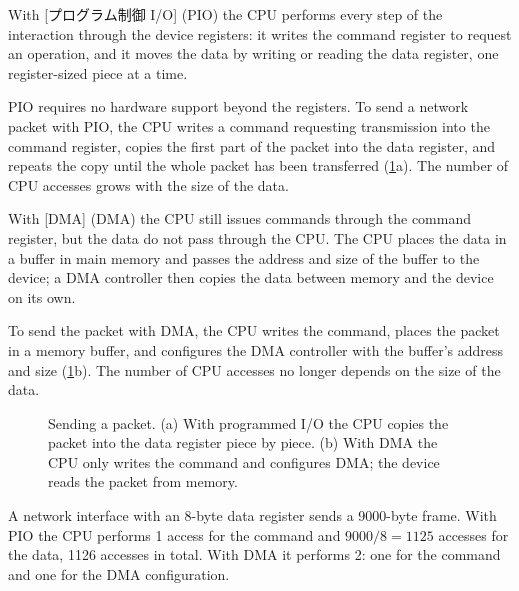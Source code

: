 \documentclass[../main.tex]{subfiles}
\begin{document}
\begin{definition}[Programmed I/O]
  With [プログラム制御 I/O]%
   (PIO) the CPU performs every step of the
  interaction through the device registers: it writes the command register
  to request an operation, and it moves the data by writing or reading the
  data register, one register-sized piece at a time.
\end{definition}

PIO requires no hardware support beyond the registers.  To send a network
packet with PIO, the CPU writes a command requesting transmission into the
command register, copies the first part of the packet into the data
register, and repeats the copy until the whole packet has been transferred
(\cref{fig:l11-pio-dma}a).  The number of CPU accesses grows with the size of
the data.

\begin{definition}
  With [DMA]
  (DMA) the CPU still issues commands through the command register, but the
  data do not pass through the CPU.  The CPU places the data in a buffer in
  main memory and passes the address and size of the buffer to the device;
  a DMA controller then copies the data between memory and the device on its
  own.
\end{definition}

To send the packet with DMA, the CPU writes the command, places the packet
in a memory buffer, and configures the DMA controller with the buffer's
address and size (\cref{fig:l11-pio-dma}b).  The number of CPU accesses no
longer depends on the size of the data.

\begin{figure}[htbp]
  \centering
  
  \caption{Sending a packet.  (a) With programmed I/O the CPU copies the
    packet into the data register piece by piece.  (b) With DMA the CPU only
    writes the command and configures DMA; the device reads the packet from
    memory.}
  \label{fig:l11-pio-dma}
\end{figure}

\begin{example}
  A network interface with an 8-byte data register sends a 9000-byte frame.
  With PIO the CPU performs 1 access for the command and $9000/8 = 1125$
  accesses for the data, 1126 accesses in total.  With DMA it performs 2: one
  for the command and one for the DMA configuration.
\end{example}
\end{document}
